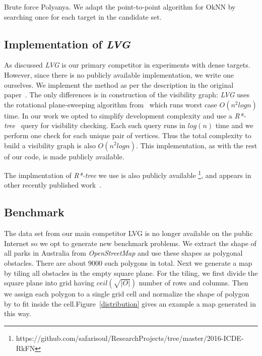\begin{algorithm}
  
  \caption{Brute force Polyanya. We adapt the point-to-point algorithm for OkNN by searching once
  for each target in the candidate set.}
  \label{brute}
\end{algorithm}

\subsection{Implementation of \textit{LVG}}
As discussed \textit{LVG} is our primary competitor in experiments with dense targets. However, since there is no publicly available implementation, we write one ourselves. We implement the method as per the description in the original paper~\cite{zhang2004spatial}. The only differences is in construction of the visibility graph: \textit{LVG} uses the rotational plane-sweeping algorithm from~\cite{sharir1986shortest} which runs worst case $O(n^2logn)$ time. In our work we opted to simplify development complexity and use a \textit{R*-tree}~\cite{beckmann1990r} query for visibility checking. Each such query runs in $log(n)$ time  and we perform one check for each unique pair of vertices. Thus the total complexity to build a visibility graph is also $O(n^2logn)$. This implementation, as with the rest of our code, is made publicly available.

The implmentation of \textit{R*-tree} we use is also publicly available \footnote{https://github.com/safarisoul/ResearchProjects/tree/master/2016-ICDE-RkFN}, and appears in other recently published work~\cite{wang2016efficiently}.

\subsection{Benchmark} \label{bm}
The data set from our main competitor LVG\cite{zhang2004spatial} is no longer available on the public Internet so we opt to generate new benchmark problems.
We extract the shape of all parks in Australia from \textit{OpenStreetMap}\cite{OpenStreetMap} and
use these shapes as polygonal obstacles. There are about 9000 such polygons in total.
Next we generate a map by tiling all obstacles in the empty square plane.
For the tiling, we first divide the square plane into grid having $\textit{ceil}(\sqrt{|O|})$ number of rows and columns.
Then we assign each polygon to a single grid cell and normalize the shape of polygon by to fit inside the cell.Figure~\ref{distribution} gives an example a map generated in this way.

